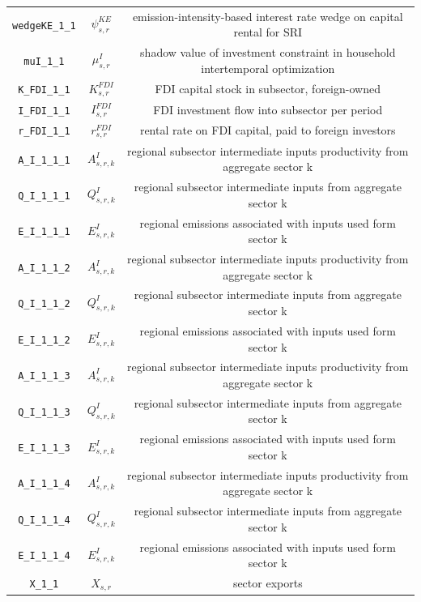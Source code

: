 \begin{center}
\begin{longtable}{ccc}
\texttt{wedgeKE\_1\_1} & ${\psi^{KE}_{s,r}}$ & emission-intensity-based interest rate wedge on capital rental for SRI\\
\texttt{muI\_1\_1} & ${\mu^{I}_{s,r}}$ & shadow value of investment constraint in household intertemporal optimization\\
\texttt{K\_FDI\_1\_1} & ${K^{FDI}_{s,r}}$ & FDI capital stock in subsector, foreign-owned\\
\texttt{I\_FDI\_1\_1} & ${I^{FDI}_{s,r}}$ & FDI investment flow into subsector per period\\
\texttt{r\_FDI\_1\_1} & ${r^{FDI}_{s,r}}$ & rental rate on FDI capital, paid to foreign investors\\
\texttt{A\_I\_1\_1\_1} & ${A^{I}_{s,r,k}}$ & regional subsector intermediate inputs productivity from aggregate sector k\\
\texttt{Q\_I\_1\_1\_1} & ${Q^{I}_{s,r,k}}$ & regional subsector intermediate inputs from aggregate sector k\\
\texttt{E\_I\_1\_1\_1} & ${E^I_{s,r,k}}$ & regional emissions associated with inputs used form sector k\\
\texttt{A\_I\_1\_1\_2} & ${A^{I}_{s,r,k}}$ & regional subsector intermediate inputs productivity from aggregate sector k\\
\texttt{Q\_I\_1\_1\_2} & ${Q^{I}_{s,r,k}}$ & regional subsector intermediate inputs from aggregate sector k\\
\texttt{E\_I\_1\_1\_2} & ${E^I_{s,r,k}}$ & regional emissions associated with inputs used form sector k\\
\texttt{A\_I\_1\_1\_3} & ${A^{I}_{s,r,k}}$ & regional subsector intermediate inputs productivity from aggregate sector k\\
\texttt{Q\_I\_1\_1\_3} & ${Q^{I}_{s,r,k}}$ & regional subsector intermediate inputs from aggregate sector k\\
\texttt{E\_I\_1\_1\_3} & ${E^I_{s,r,k}}$ & regional emissions associated with inputs used form sector k\\
\texttt{A\_I\_1\_1\_4} & ${A^{I}_{s,r,k}}$ & regional subsector intermediate inputs productivity from aggregate sector k\\
\texttt{Q\_I\_1\_1\_4} & ${Q^{I}_{s,r,k}}$ & regional subsector intermediate inputs from aggregate sector k\\
\texttt{E\_I\_1\_1\_4} & ${E^I_{s,r,k}}$ & regional emissions associated with inputs used form sector k\\
\texttt{X\_1\_1} & ${X_{s,r}}$ & sector exports\\

\end{longtable}
\end{center}
